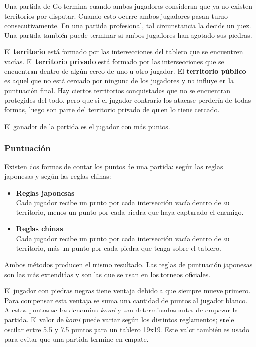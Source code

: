 Una partida de Go termina cuando ambos jugadores consideran que ya no existen territorios por disputar.
Cuando esto ocurre ambos jugadores pasan turno consecutivamente.
En una partida profesional, tal circunstancia la decide un juez.
Una partida también puede terminar si ambos jugadores han agotado sus piedras.

El \textbf{territorio} está formado por las intersecciones del tablero que se encuentren vacías.
El \textbf{territorio privado} está formado por las intersecciones que se encuentran dentro de algún cerco de uno u otro jugador.
El \textbf{territorio público} es aquel que no está cercado por ninguno de los jugadores y no influye en la puntuación final.
Hay ciertos territorios conquistados que no se encuentran protegidos del todo, pero que si el jugador contrario los atacase perdería de todas formas, luego son parte del territorio privado de quien lo tiene cercado.

El ganador de la partida es el jugador con más puntos.

\subsubsection{Puntuación}
\label{sssec:puntuacion_go}
Existen dos formas de contar los puntos de una partida: según las reglas japonesas y según las reglas chinas:

\bigskip

\begin{itemize}
	\item \textbf{Reglas japonesas}\\
	Cada jugador recibe un punto por cada intersección vacía dentro de su territorio, menos un punto por cada piedra que haya capturado el enemigo.
	\item \textbf{Reglas chinas}\\
	Cada jugador recibe un punto por cada intersección vacía dentro de su territorio, más un punto por cada piedra que tenga sobre el tablero. 
\end{itemize}
Ambos métodos producen el mismo resultado. Las reglas de puntuación japonesas son las más extendidas y son las que se usan en los torneos oficiales.

El jugador con piedras negras tiene ventaja debido a que siempre mueve primero.
Para compensar esta ventaja se suma una cantidad de puntos al jugador blanco.
A estos puntos se les denomina \textit{komi} y son determinados antes de empezar la partida.
El valor de \textit{komi} puede variar según los distintos reglamentos; suele oscilar entre 5.5 y 7.5 puntos para un tablero 19x19.
Este valor también es usado para evitar que una partida termine en empate.

